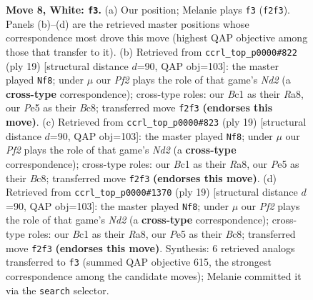 \documentclass[11pt]{article}
\begin{document}
\begin{figure}[p]
\caption{\textbf{Move 8, White: \texttt{f3}.} (a) Our position; Melanie plays \texttt{f3} (\texttt{f2f3}). Panels (b)--(d) are the retrieved master positions whose correspondence most drove this move (highest QAP objective among those that transfer to it). (b) Retrieved from \texttt{ccrl\_top\_p0000\#822} (ply 19) [structural distance $d$=90, QAP obj=103]: the master played \texttt{Nf8}; under $\mu$ our \emph{Pf2} plays the role of that game's \emph{Nd2} (a \textbf{cross-type} correspondence); cross-type roles: our \emph{B}c1 as their \emph{R}a8, our \emph{P}e5 as their \emph{B}c8; transferred move \texttt{f2f3} \textbf{(endorses this move)}. (c) Retrieved from \texttt{ccrl\_top\_p0000\#823} (ply 19) [structural distance $d$=90, QAP obj=103]: the master played \texttt{Nf8}; under $\mu$ our \emph{Pf2} plays the role of that game's \emph{Nd2} (a \textbf{cross-type} correspondence); cross-type roles: our \emph{B}c1 as their \emph{R}a8, our \emph{P}e5 as their \emph{B}c8; transferred move \texttt{f2f3} \textbf{(endorses this move)}. (d) Retrieved from \texttt{ccrl\_top\_p0000\#1370} (ply 19) [structural distance $d$=90, QAP obj=103]: the master played \texttt{Nf8}; under $\mu$ our \emph{Pf2} plays the role of that game's \emph{Nd2} (a \textbf{cross-type} correspondence); cross-type roles: our \emph{B}c1 as their \emph{R}a8, our \emph{P}e5 as their \emph{B}c8; transferred move \texttt{f2f3} \textbf{(endorses this move)}. Synthesis: 6 retrieved analogs transferred to \texttt{f3} (summed QAP objective 615, the strongest correspondence among the candidate moves); Melanie committed it via the \texttt{search} selector.}
\label{fig:thought-m14}
\end{figure}

\clearpage
\end{document}
